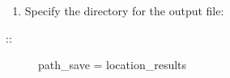 \documentclass[a4paper,11pt,english]{sphinxmanual}
\begin{document}
\begin{sphinxVerbatim}[commandchars=\\\{\}]
     
\end{sphinxVerbatim}
\begin{enumerate}
%
\setcounter{enumi}{2}
\item {} 
Specify the directory for the output file:

\end{enumerate}
\begin{description}
\item[{::}] \leavevmode
path\_save = location\_results

\end{description}
\end{document}
